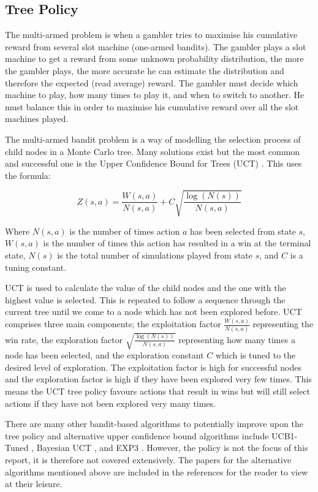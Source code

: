 \documentclass{bhamthesis}
\theoremstyle{definition}
\begin{document}
\subsection{Tree Policy}\label{s:tPolicy}
The multi-armed problem is when a gambler tries to maximise his cumulative reward from several slot machine (one-armed bandits). The gambler plays a slot machine to get a reward from some unknown probability distribution, the more the gambler plays, the more accurate he can estimate the distribution and therefore the expected (read average) reward. The gambler must decide which machine to play, how many times to play it, and when to switch to another. He must balance this in order to maximise his cumulative reward over all the slot machines played. 

The multi-armed bandit problem is a way of modelling the selection process of child nodes in a Monte Carlo tree. Many solutions exist but the most common and successful one is the Upper Confidence Bound for Trees (UCT) \cite{Browne2012}. This uses the formula:

\begin{equation}\label{e:UCT}
Z(s,a) = \frac{W(s,a)}{N(s,a)} + C\sqrt{\frac{\log(N(s))}{N(s,a)}}
\end{equation} 


Where $N(s,a)$ is the number of times action $a$ has been selected from state $s$, $W(s,a)$ is the number of times this action has resulted in a win at the terminal state, $N(s)$ is the total number of simulations played from state $s$, and $C$ is a tuning constant.

UCT is used to calculate the value of the child nodes and the one with the highest value is selected. This is repeated to follow a sequence through the current tree until we come to a node which has not been explored before. UCT comprises three main components; the exploitation factor $\frac{W(s,a)}{N(s,a)}$ representing the win rate, the exploration factor $\sqrt{\frac{\log(N(s))}{N(s,a)}}$ representing how many times a node has been selected, and the exploration constant $C$ which is tuned to the desired level of exploration. The exploitation factor is high for successful nodes and the exploration factor is high if they have been explored very few times. This means the UCT tree policy favours actions that result in wins but will still select actions if they have not been explored very many times.

There are many other bandit-based algorithms to potentially improve upon the tree policy and alternative upper confidence bound algorithms include UCB1-Tuned \cite{Auer2002}, Bayesian UCT \cite{Grunwald2010}, and EXP3 \cite{Auer1995} \cite{Audibert2009}. However, the policy is not the focus of this report, it is therefore not covered extensively. The papers for the alternative algorithms mentioned above are included in the references for the reader to view at their leisure.
\end{document}
